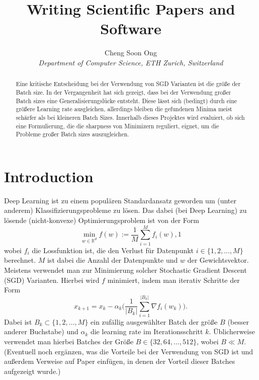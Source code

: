 \documentclass[10pt,conference,compsocconf]{IEEEtran}
\begin{document}
\title{Writing Scientific Papers and Software}

\author{
  Cheng Soon Ong\\
  \textit{Department of Computer Science, ETH Zurich, Switzerland}
}

\maketitle

\begin{abstract}
  Eine kritische Entscheidung bei der Verwendung von SGD Varianten ist die größe der Batch size. In der Vergangenheit hat sich gezeigt, dass bei der Verwendung großer Batch sizes eine Generalisierungslücke entsteht. Diese lässt sich (bedingt) durch eine größere Learning rate ausgleichen, allerdings bleiben die gefundenen Minima meist schärfer als bei kleineren Batch Sizes. Innerhalb dieses Projektes wird evaluiert, ob sich eine Formulierung, die die sharpness von Minimizern reguliert, eignet, um die Probleme großer Batch sizes auszugleichen. 
\end{abstract}

\section{Introduction}

Deep Learning ist zu einem populären Standardansatz geworden um (unter anderem) Klassifizierungsprobleme zu lösen. 
Das dabei (bei Deep Learning) zu lösende (nicht-konvexe) Optimierungsproblem ist von der Form 
\begin{equation}
\min_{w \in \mathbb{R}^d}{f(w) := \frac{1}{M} \sum_{i = 1}^M{f_i(w)}},1
\end{equation}
wobei $f_i$ die Lossfunktion ist, die den Verlust für Datenpunkt $i \in \{1, 2, ..., M\}$ berechnet. $M$ ist dabei die Anzahl der Datenpunkte und $w$ der Gewichtsvektor. 
Meistens verwendet man zur Minimierung solcher Stochastic Gradient Descent (SGD) Varianten. Hierbei wird $f$ minimiert, indem man iterativ Schritte der Form
\begin{equation}
x_{k+1} = x_k - \alpha_k \biggl(\frac{1}{|B_k|} \sum_{i = 1}^{|B_k|}{\nabla f_i(w_k) \biggl)}.
\end{equation}
Dabei ist $B_k \subset \{1,2,..., M\}$ ein zufällig ausgewählter Batch der größe $B$ (besser anderer Buchstabe) und $\alpha_k$ die learning rate im Iterationsschritt $k$. Üblicherweise verwendet man hierbei Batches der Größe $B \in \{32, 64, ..., 512\}$, wobei $B \ll M$. (Eventuell noch ergänzen, was die Vorteile bei der Verwendung von SGD ist und außerdem Verweise auf Paper einfügen, in denen der Vorteil dieser Batches aufgezeigt wurde.)
\end{document}
